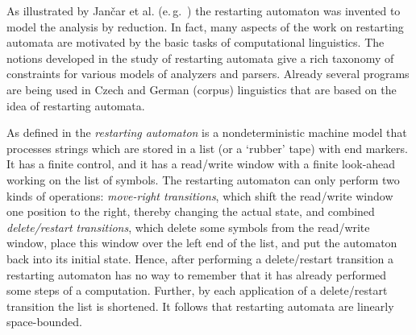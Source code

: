 As illustrated by Jančar et al. (e.\,g.\ \cite{JMPV99}) the restarting automaton was invented to model the analysis by reduction. In fact, many aspects of the work on restarting automata are motivated by the basic tasks of computational linguistics. The notions developed in the study of restarting automata give a rich taxonomy of constraints for various models of analyzers and parsers. Already several programs are being used in Czech and German (corpus) linguistics that are based on the idea of restarting automata.

As defined in \cite{JMPV95} the \emph{restarting automaton} is a nondeterministic machine model that processes strings which are stored in a list (or a ‘rubber’ tape) with end markers. It has a finite control, and it has a read/write window with a finite look-ahead working on the list of symbols. The restarting automaton can only perform two kinds of operations:  \emph{move-right transitions}, which shift the read/write window one position to the right, thereby changing the actual state, and combined \emph{delete/restart transitions}, which delete some symbols from the read/write window, place this window over the left end of the list, and put the automaton back into its initial state. Hence, after performing a delete/restart transition a restarting automaton has no way to remember that it has already performed some steps of a computation. Further, by each application of a delete/restart transition the list is shortened. It follows that restarting automata are linearly space-bounded.

